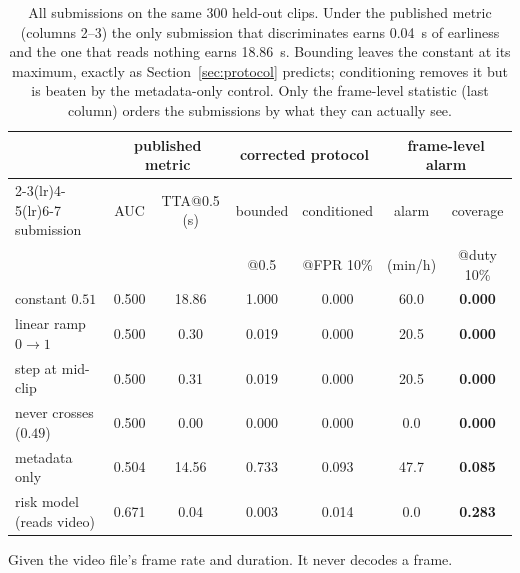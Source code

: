 \begin{table}[t]
\caption{All submissions on the same 300 held-out clips. Under the published
metric (columns 2--3) the only submission that discriminates earns
\SI{0.04}{\second} of earliness and the one that reads nothing earns
\SI{18.86}{\second}. Bounding leaves the constant at its maximum, exactly as
Section~\ref{sec:protocol} predicts; conditioning removes it but is beaten by
the metadata-only control. Only the frame-level statistic (last column) orders
the submissions by what they can actually see.}
\label{tab:nexar-held}
\centering
\begin{tabular}{@{}lcc cc cc@{}}
\toprule
& \multicolumn{2}{c}{published metric}
& \multicolumn{2}{c}{corrected protocol}
& \multicolumn{2}{c}{frame-level alarm} \\
\cmidrule(lr){2-3}\cmidrule(lr){4-5}\cmidrule(lr){6-7}
submission & AUC & TTA@0.5 (s) & bounded & conditioned & alarm & coverage \\
 &  &  & @0.5 & @FPR 10\% & (min/h) & @duty 10\% \\
\midrule
constant $0.51$ & 0.500 & 18.86 & 1.000 & 0.000 & 60.0 & \textbf{0.000} \\
linear ramp $0\!\to\!1$ & 0.500 & 0.30 & 0.019 & 0.000 & 20.5 & \textbf{0.000} \\
step at mid-clip & 0.500 & 0.31 & 0.019 & 0.000 & 20.5 & \textbf{0.000} \\
never crosses ($0.49$) & 0.500 & 0.00 & 0.000 & 0.000 & 0.0 & \textbf{0.000} \\
metadata only\tnote{a} & 0.504 & 14.56 & 0.733 & 0.093 & 47.7 & \textbf{0.085} \\
risk model (reads video) & 0.671 & 0.04 & 0.003 & 0.014 & 0.0 & \textbf{0.283} \\
\bottomrule
\end{tabular}
\begin{tablenotes}
\item[a] Given the video file's frame rate and duration. It never decodes a
frame.
\end{tablenotes}
\end{table}

